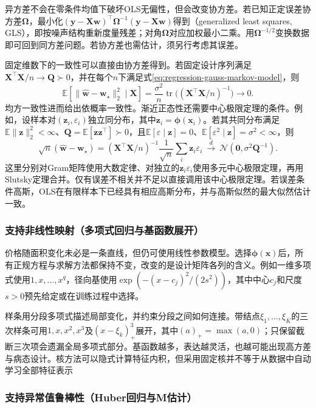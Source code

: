 异方差不会在零条件均值下破坏OLS无偏性，但会改变协方差。若已知正定误差协方差$\bm{\Omega}$，最小化$(\bm{y}-\bm{X}\bm{w})^{\top}\bm{\Omega}^{-1}(\bm{y}-\bm{X}\bm{w})$得到（generalized least squares, GLS），即按噪声结构重新度量残差；对角$\bm{\Omega}$对应加权最小二乘。用$\bm{\Omega}^{-1/2}$变换数据即可回到同方差问题。若协方差也需估计，须另行考虑其误差。

固定维数下的一致性可以直接由协方差得到。若固定设计序列满足$\bm{X}^{\top}\bm{X}/n\to\bm{Q}\succ0$，并在每个$n$下满足式\eqref{eq:regression-gauss-markov-model}，则
\[
  \mathbb{E}[\lVert\widehat{\bm{w}}-\bm{w}_{\star}\rVert_2^2\mid\bm{X}]
  =\frac{\sigma^2}{n}\operatorname{tr}
       \bigl((\bm{X}^{\top}\bm{X}/n)^{-1}\bigr)\longrightarrow0.
\]
均方一致性进而给出依概率一致性。渐近正态性还需要中心极限定理的条件。例如，设样本对$(\bm{z}_i,\varepsilon_i)$独立同分布，其中$\bm{z}_i=\bm{\phi}(\bm{x}_i)$。若其共同分布满足$\mathbb{E}\lVert\bm{z}\rVert_2^2<\infty$、$\bm{Q}=\mathbb{E}[\bm{z}\bm{z}^{\top}]\succ0$，且$\mathbb{E}[\varepsilon\mid\bm{z}]=0$、$\mathbb{E}[\varepsilon^2\mid\bm{z}]=\sigma^2<\infty$，则
\[
  \sqrt n(\widehat{\bm{w}}-\bm{w}_{\star})
  =
  (\bm{X}^{\top}\bm{X}/n)^{-1}
  \frac{1}{\sqrt n}\sum_i\bm{z}_i\varepsilon_i
  \ \xrightarrow{d}\ \mathcal{N}(\bm{0},\sigma^2\bm{Q}^{-1}).
\]
这里分别对Gram矩阵使用大数定律、对独立的$\bm{z}_i\varepsilon_i$使用多元中心极限定理，再用Slutsky定理合并。仅有误差不相关并不足以直接调用该中心极限定理。若误差条件高斯，OLS在有限样本下已经具有相应高斯分布，并与高斯似然的最大似然估计一致。

\subsubsection{支持非线性映射（多项式回归与基函数展开）}
\label{sec:regression-basis}

价格随面积变化未必是一条直线，但仍可使用线性参数模型。选择$\bm{\phi}(\bm{x})$后，所有正规方程与求解方法都保持不变，改变的是设计矩阵各列的含义。例如一维多项式使用$1,x,\ldots,x^q$，径向基使用$\exp(-(x-c_j)^2/(2s^2))$，其中中心$c_j$和尺度$s>0$预先给定或在训练过程中选择。

样条用分段多项式描述局部变化，并约束分段之间如何连接。带结点$\xi_1,\ldots,\xi_K$的三次样条可用$1,x,x^2,x^3$及$(x-\xi_k)_+^3$展开，其中$(a)_+=\max(a,0)$；只保留截断三次项会遗漏全局多项式部分。基函数越多，表达越灵活，也越可能出现高方差与病态设计。核方法可以隐式计算特征内积，但采用固定核并不等于从数据中自动学习全部特征表示

\subsubsection{支持异常值鲁棒性（Huber回归与M估计）}
\label{sec:regression-huber}

